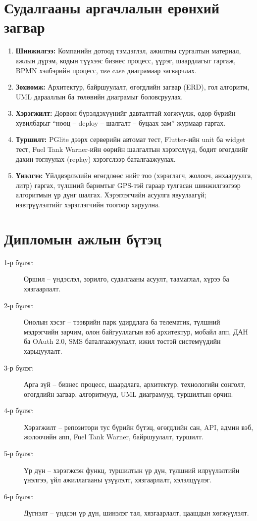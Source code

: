 \documentclass[
12pt,
oneside,
english,
onehalfspacing,
nolistspacing,
headsepline,
]{MUST-Thesis}
\begin{document}
\section{Судалгааны аргачлалын ерөнхий загвар}

\begin{enumerate}
    \item \textbf{Шинжилгээ:} Компанийн дотоод тэмдэглэл, ажилтны сургалтын материал, ажлын дүрэм, кодын түүхээс бизнес процесс, үүрэг, шаардлагыг гаргаж, BPMN хэлбэрийн процесс, use case диаграмаар загварчлах.
    \item \textbf{Зохиомж:} Архитектур, байршуулалт, өгөгдлийн загвар (ERD), гол алгоритм, UML дарааллын ба төлөвийн диаграмыг боловсруулах.
    \item \textbf{Хэрэгжилт:} Дөрвөн бүрэлдэхүүнийг давталттай хөгжүүлж, өдөр бүрийн хувилбарыг ``нөөц -- deploy -- шалгалт -- буцаах зам'' журмаар гаргах.
    \item \textbf{Туршилт:} PGlite дээрх серверийн автомат тест, Flutter-ийн unit ба widget тест, Fuel Tank Warner-ийн өөрийн шалгалтын хэрэгслүүд, бодит өгөгдлийг дахин тоглуулах (replay) хэрэгслээр баталгаажуулах.
    \item \textbf{Үнэлгээ:} Үйлдвэрлэлийн өгөгдлөөс нийт тоо (хэрэглэгч, жолооч, анхааруулга, литр) гаргах, түлшний баримтыг GPS-тэй гараар тулгасан шинжилгээгээр алгоритмын үр дүнг шалгах. Хэрэглэгчийн асуулга явуулаагүй; нэвтрүүлэлтийг хэрэглэгчийн тоогоор харуулна.
\end{enumerate}

\section{Дипломын ажлын бүтэц}

\begin{description}
    \item[1-р бүлэг:] Оршил -- үндэслэл, зорилго, судалгааны асуулт, таамаглал, хүрээ ба хязгаарлалт.
    \item[2-р бүлэг:] Онолын хэсэг -- тээврийн парк удирдлага ба телематик, түлшний мэдрэгчийн зарчим, олон байгууллагын вэб архитектур, мобайл апп, ДАН ба OAuth 2.0, SMS баталгаажуулалт, ижил төстэй системүүдийн харьцуулалт.
    \item[3-р бүлэг:] Арга зүй -- бизнес процесс, шаардлага, архитектур, технологийн сонголт, өгөгдлийн загвар, алгоритмууд, UML диаграмууд, туршилтын орчин.
    \item[4-р бүлэг:] Хэрэгжилт -- репозитори тус бүрийн бүтэц, өгөгдлийн сан, API, админ вэб, жолоочийн апп, Fuel Tank Warner, байршуулалт, туршилт.
    \item[5-р бүлэг:] Үр дүн -- хэрэгжсэн функц, туршилтын үр дүн, түлшний илрүүлэлтийн үнэлгээ, үйл ажиллагааны үзүүлэлт, хязгаарлалт, хэлэлцүүлэг.
    \item[6-р бүлэг:] Дүгнэлт -- үндсэн үр дүн, шинэлэг тал, хязгаарлалт, цаашдын хөгжүүлэлт.
\end{description}
\end{document}
